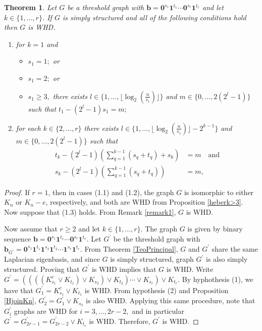 \documentclass[preprint]{elsarticle}
\newtheorem{theorem}{Theorem}[section]
\begin{document}
\begin{theorem}\label{teorema whd}
    Let $G$ be a threshold graph with $\mathbf{b}=\mathbf{0}^{s_1}\mathbf{1}^{t_1}\cdots\mathbf{0}^{s_r}\mathbf{1}^{t_r}$ and let $k\in \{1,\ldots,r\}$. {If $G$ is simply structured and all of the following conditions hold then $G$ is WHD.}
    \begin{enumerate}
        \item[(1) ] for $k=1$ and 
            \begin{itemize}
                \item[(1.1) ] $s_1=1;$ or
                \item[(1.2) ] $s_1=2;$ or
                \item[(1.3) ] $s_1 \ge 3,$ there exists $l \in \{1, \ldots, \lfloor\log_2(\frac{n}{s_1})\rfloor\}$ and $m \in \{0,\ldots,2(2^l-1)\}$ such that $t_1-(2^l-1)s_1 = m;$
            \end{itemize}
        \item[(2) ] for each $k \in \{2,\ldots,r\}$  there exists $l \in \{1, \ldots, \lfloor\log_2(\frac{n}{s_1})\rfloor - 2^{k-1}\}$ and $m \in \{0,\ldots,2(2^l-1)\}$ such that 
        \begin{align}
            t_k - (2^l-1) \left(\sum_{q=1}^{k-1} (s_q + t_q) + s_k \right)  & = m \label{ti}  \quad \text{and} \\
            s_k - (2^l-1) \left(\sum_{q=1}^{k-1} (s_q + t_q) \right)  & = m \label{si}, 
\end{align}   
    \end{enumerate}
\end{theorem}
\begin{proof}
If $r=1$, then in cases (1.1) and (1.2), the graph $G$ is isomorphic to either $K_{n}$ or $K_{n} - e$, respectively, and both are WHD from Proposition \ref{heberk>3}. Now suppose that (1.3) holds. From Remark \ref{remark1}, $G$ is WHD.

Now assume that $r \geq 2$ and let $k \in \{1,\ldots,r\}.$  The graph $G$ is given by binary sequence $\mathbf{b}=\mathbf{0}^{s_1}\mathbf{1}^{t_1}\cdots\mathbf{0}^{s_r}\mathbf{1}^{t_r}$. Let $G^{\prime}$ be the threshold graph with $\mathbf{b}_{G^{\prime}} = \mathbf{0}^{s_1}\mathbf{1}^{t_1}\mathbf{1}^{s_2}\mathbf{1}^{t_2}\cdots\mathbf{1}^{s_r}\mathbf{1}^{t_r}$. From Theorem \ref{TeoPrincipal}, $G$ and $G^{\prime}$ share the same Laplacian eigenbasis, and since $G$ is simply structured, graph $G^{\prime}$ is also simply structured. Proving that $G^{\prime}$ is WHD implies that $G$ is WHD.
Write $G^{\prime} = ((((K_{s_1}^{c} \vee K_{t_1}) \vee K_{s_2}) \vee K_{t_2}) \cdots \vee K_{s_r}) \vee K_{t_r}$. By hyphothesis (1), we have that   $G^{\prime}_{1} = K_{s_1}^{c} \vee K_{t_1}$ is WHD. From hypothesis (2) and Proposition \ref{HjoinKn}, 
$G^{\prime}_{2} = G^{\prime}_{1} \vee K_{s_2}$ is also WHD. Applying this same procedure, note that  
$G^{\prime}_{i}$ graphs are WHD for $i = 3,\ldots,2r-2,$ and in particular $G^{\prime} = G^{\prime}_{2r-1} = G^{\prime}_{2r-2} \vee K_{t_r}$ is WHD. Therefore, $G^{\prime}$ is WHD. 
\end{proof}
\end{document}
